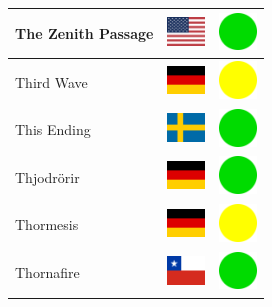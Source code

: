 \documentclass[12pt, a4paper, twoside]{report}
\begin{document}
\begin{center}
\begin{longtable}{|p{5cm}|p{2cm}|p{2cm}|}
 The Zenith Passage                                         & \includegraphics[width=1cm]{../img/flags/us} &   \includegraphics[width=1cm]{../likes/y} \\ \hline
 Third Wave                                                 & \includegraphics[width=1cm]{../img/flags/de} &   \includegraphics[width=1cm]{../likes/m} \\ \hline
 This Ending                                                & \includegraphics[width=1cm]{../img/flags/se} &   \includegraphics[width=1cm]{../likes/y} \\ \hline
 Thjodrörir                                                 & \includegraphics[width=1cm]{../img/flags/de} &   \includegraphics[width=1cm]{../likes/y} \\ \hline
 Thormesis                                                  & \includegraphics[width=1cm]{../img/flags/de} &   \includegraphics[width=1cm]{../likes/m} \\ \hline
 Thornafire                                                 & \includegraphics[width=1cm]{../img/flags/cl} &   \includegraphics[width=1cm]{../likes/y} \\ \hline

\end{longtable}
\end{center}
\end{document}
